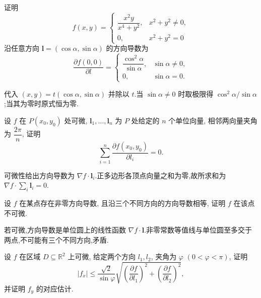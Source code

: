 \begin{example}
    证明
    \[
        f(x,y)=
        \begin{cases}
            \dfrac{x^2y}{x^4+y^2}, & x^2+y^2\ne0, \\
            0,                     & x^2+y^2=0
        \end{cases}
    \]
    沿任意方向 $\bm l=(\cos\alpha,\sin\alpha)$ 的方向导数为
    \[
        \dfrac{\partial f(0,0)}{\partial l}
        =\begin{cases}
            \dfrac{\cos^2\alpha}{\sin\alpha}, & \sin\alpha\ne0, \\
            0,                                & \sin\alpha=0.
        \end{cases}
    \]
\end{example}
\exampleblank

\begin{solution}
    代入 $(x,y)=t(\cos\alpha,\sin\alpha)$ 并除以 $t$.当 $\sin\alpha\ne0$ 时取极限得 $\cos^2\alpha/\sin\alpha$;当其为零时原式恒为零.
\end{solution}

\begin{example}
    设 $f$ 在 $P(x_0,y_0)$ 处可微, $\bm l_1,\ldots,\bm l_n$ 为 $P$ 处给定的 $n$ 个单位向量, 相邻两向量夹角为 $\dfrac{2\pi}{n}$, 证明
    \[
        \displaystyle\sum\limits_{i=1}^n\dfrac{\partial f(x_0,y_0)}{\partial l_i}=0.
    \]
\end{example}
\exampleblank

\begin{solution}
    可微性给出方向导数为 $\nabla f\cdot\bm l_i$.正多边形各顶点向量之和为零,故所求和为 $\nabla f\cdot\displaystyle\sum_i\bm l_i=0$.
\end{solution}

\begin{example}
    设 $f$ 在某点存在非零方向导数, 且沿三个不同方向的方向导数相等, 证明 $f$ 在该点不可微.
\end{example}
\exampleblank

\begin{solution}
    若可微,方向导数是单位圆上的线性函数 $\nabla f\cdot\bm l$.非零常数等值线与单位圆至多交于两点,不可能有三个不同方向,矛盾.
\end{solution}

\begin{example}
    设 $f$ 在区域 $D\subseteq\mathbb{R}^2$ 上可微, 给定两个方向 $l_1,l_2$, 夹角为 $\varphi$ $(0<\varphi<\pi)$, 证明
    \[
        |f_x|\leq\dfrac{\sqrt2}{\sin\varphi}
        \sqrt{\left(\dfrac{\partial f}{\partial l_1}\right)^2+
            \left(\dfrac{\partial f}{\partial l_2}\right)^2},
    \]
    并证明 $f_y$ 的对应估计.
\end{example}
\exampleblank

